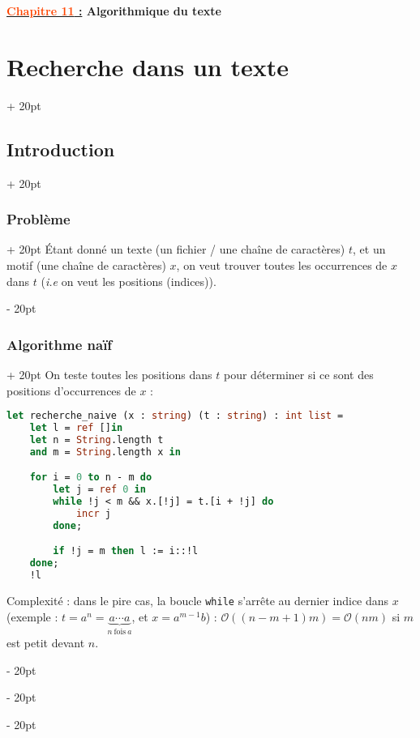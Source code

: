 \documentclass[a4paper, 12pt, twoside]{article}
\renewcommand{\emph}{\textcolor{ff4500}}
\newcommand{\ind}[1][20pt]{\advance\leftskip + #1}
\newcommand{\deind}[1][20pt]{\advance\leftskip - #1}
\newenvironment{indt}[2][20pt]{#2 \par \ind[#1]}{\par \deind} %
\newcommand{\thetitle}[2]{\begin{center}\textbf{{\LARGE \underline{\emph{#1} :}} {\Large #2}}\end{center}}
\begin{document}
    
    
    \thetitle{Chapitre 11}{Algorithmique du texte}
    
    \tableofcontents
    \newpage
    
    
    \begin{indt}{\section{Recherche dans un texte}}
        
        \begin{indt}{\subsection{Introduction}}
            \begin{indt}{\subsubsection{Problème}}
                \'Etant donné un texte (un fichier / une chaîne de caractères) $t$, et un motif (une chaîne de caractères) $x$, on veut trouver toutes les occurrences de $x$ dans $t$ (\textit{i.e} on veut les positions (indices)).
            \end{indt}

            \vspace{12pt}
            
            \begin{indt}{\subsubsection{Algorithme naïf}}
                On teste toutes les positions dans $t$ pour déterminer si ce sont des positions d'occurrences de $x$ :

                \begin{lstlisting}[language=Caml, xleftmargin=80pt]
let recherche_naive (x : string) (t : string) : int list =
    let l = ref []in
    let n = String.length t
    and m = String.length x in

    for i = 0 to n - m do
        let j = ref 0 in
        while !j < m && x.[!j] = t.[i + !j] do
            incr j
        done;

        if !j = m then l := i::!l
    done;
    !l\end{lstlisting}

                Complexité : dans le pire cas, la boucle \texttt{while} s'arrête au dernier indice dans $x$ (exemple : $t = a^n = \underbrace{a \cdots a}_{n\ \text{fois}\ a}$, et $x = a^{m - 1}b$) : $\mathcal O((n - m + 1)m) = \mathcal O(nm)$ si $m$ est petit devant $n$.
            \end{indt}


\end{indt}
\end{indt}
\end{document}

